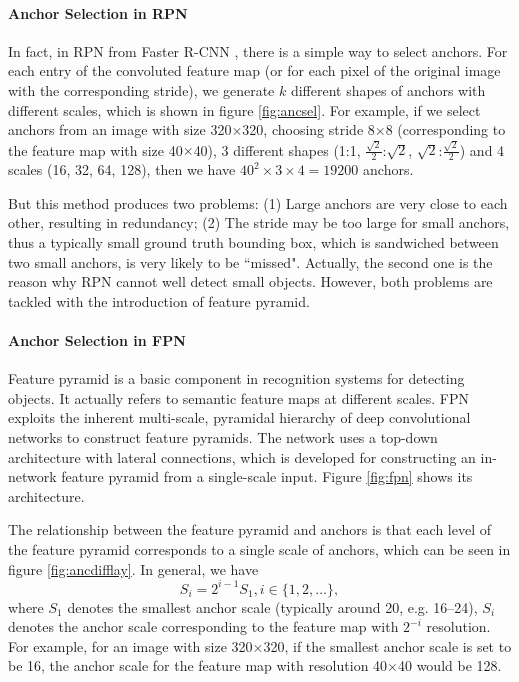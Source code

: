 \paragraph{Anchor Selection in RPN}
In fact, in RPN from Faster R-CNN \cite{fasterrcnn}, there is a simple way to select anchors. For each entry of the convoluted feature map (or for each pixel of the original image with the corresponding stride), we generate $k$ different shapes of anchors with different scales, which is shown in figure \ref{fig:ancsel}. For example, if we select anchors from an image with size 320$\times$320, choosing stride 8$\times$8 (corresponding to the feature map with size 40$\times$40), 3 different shapes (1:1, $\frac{\sqrt{2}}{2}$:$\sqrt{2}$, $\sqrt{2}$:$\frac{\sqrt{2}}{2}$) and 4 scales (16, 32, 64, 128), then we have $40^2\times3\times4=19200$ anchors.



But this method produces two problems: (1) Large anchors are very close to each other, resulting in redundancy; (2) The stride may be too large for small anchors, thus a typically small ground truth bounding box, which is sandwiched between two small anchors, is very likely to be ``missed". Actually, the second one is the reason why RPN cannot well detect small objects. However, both problems are tackled with the introduction of feature pyramid.

\paragraph{Anchor Selection in FPN}
Feature pyramid is a basic component in recognition systems for detecting objects. It actually refers to semantic feature maps at different scales. FPN exploits the inherent multi-scale, pyramidal hierarchy of deep convolutional networks to construct feature pyramids. The network uses a top-down architecture with lateral connections, which is developed for constructing an in-network feature pyramid from a single-scale input. Figure \ref{fig:fpn} shows its architecture.



The relationship between the feature pyramid and anchors is that each level of the feature pyramid corresponds to a single scale of anchors, which can be seen in figure \ref{fig:ancdifflay}. In general, we have
\begin{equation}
	S_i = 2^{i-1}S_1, i \in \{1,2,\ldots\},
\end{equation}
where $S_1$ denotes the smallest anchor scale (typically around 20, e.g. 16--24), $S_i$ denotes the anchor scale corresponding to the feature map with $2^{-i}$ resolution. For example, for an image with size 320$\times$320, if the smallest anchor scale is set to be 16, the anchor scale for the feature map with resolution 40$\times$40 would be 128.

